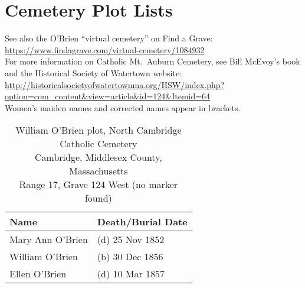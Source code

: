 \chapter{Cemetery Plot Lists}
\nonzeroparskip
\setlength{\parindent}{0cm}

See also the O'Brien ``virtual cemetery'' on Find a Grave: \url{https://www.findagrave.com/virtual-cemetery/1084932}
\\[\baselineskip]
For more information on Catholic Mt.\ Auburn Cemetery, see Bill McEvoy's book and the Historical Society of Watertown website:\\ \url{http://historicalsocietyofwatertownma.org/HSW/index.php?option=com_content&view=article&id=124&Itemid=64}
\\[\baselineskip]
Women's maiden names and corrected names appear in brackets.

\begin{table}[ht]
	\centering
		\caption{William O'Brien plot, North Cambridge Catholic Cemetery\cite{DianaBerberenaLetter1:3} \\
		Cambridge, Middlesex County, Massachusetts\\
		Range 17, Grave 124 West (no marker found)}
	\begin{tabular}{|l|l|}
		\hline
		\textbf{Name} & \textbf{Death/Burial Date} \\
		\hline
	Mary Ann O'Brien\index{O'Brien!Mary Ann\textsuperscript{3} (1852--1852)} & (d) 25 Nov 1852 \\
	\hline
	William O'Brien\index{O'Brien!William\textsuperscript{1}} & (b) 30 Dec 1856 \\
	\hline
	Ellen O'Brien\index{O'Brien!Ellen\textsuperscript{3} (1853--1857)} & (d) 10 Mar 1857 \\
	\hline
	\end{tabular}
\end{table}

